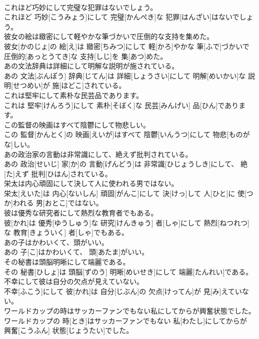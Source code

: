 \documentclass[8pt]{extreport}
\begin{document}
\begin{CJK}{UTF8}{min}
\\	これほど巧妙にして完璧な犯罪はないでしょう。	
\\	これほど 巧妙[こうみょう]にして 完璧[かんぺき]な 犯罪[はんざい]はないでしょう。
\\	彼女の絵は緻密にして軽やかな筆づかいで圧倒的な支持を集めた。	
\\	彼女[かのじょ]の 絵[え]は 緻密[ちみつ]にして 軽[かろ]やかな 筆[ふで]づかいで 圧倒的[あっとうてき]な 支持[しじ]を 集[あつ]めた。
\\	あの文法辞典は詳細にして明解な説明が施されている。	
\\	あの 文法[ぶんぽう] 辞典[じてん]は 詳細[しょうさい]にして 明解[めいかい]な 説明[せつめい]が 施[ほどこ]されている。
\\	これは堅牢にして素朴な民芸品であります。	
\\	これは 堅牢[けんろう]にして 素朴[そぼく]な 民芸[みんげい] 品[ひん]であります。
\\	この監督の映画はすべて陰鬱にして物悲しい。	
\\	この 監督[かんとく]の 映画[えいが]はすべて 陰鬱[いんうつ]にして 物悲[ものがな]しい。
\\	あの政治家の言動は非常識にして、絶えず批判されている。	
\\	あの 政治[せいじ] 家[か]の 言動[げんどう]は 非常識[ひじょうしき]にして、 絶[た]えず 批判[ひはん]されている。
\\	栄太は内心頑固にして決して人に使われる男ではない。	
\\	栄太[えいた]は 内心[ないしん] 頑固[がんこ]にして 決[けっ]して 人[ひと]に 使[つか]われる 男[おとこ]ではない。
\\	彼は優秀な研究者にして熱烈な教育者でもある。	
\\	彼[かれ]は 優秀[ゆうしゅう]な 研究[けんきゅう] 者[しゃ]にして 熱烈[ねつれつ]な 教育[きょういく] 者[しゃ]でもある。
\\	あの子はかわいくて、頭がいい。	
\\	あの 子[こ]はかわいくて、 頭[あたま]がいい。
\\	その秘書は頭脳明晰にして端麗である。	
\\	その 秘書[ひしょ]は 頭脳[ずのう] 明晰[めいせき]にして 端麗[たんれい]である。
\\	不幸にして彼は自分の欠点が見えていない。	
\\	不幸[ふこう]にして 彼[かれ]は 自分[じぶん]の 欠点[けってん]が 見[み]えていない。
\\	ワールドカップの時はサッカーファンでもない私にしてからが興奮状態でした。	
\\	ワールドカップの 時[とき]はサッカーファンでもない 私[わたし]にしてからが 興奮[こうふん] 状態[じょうたい]でした。

\end{CJK}
\end{document}
